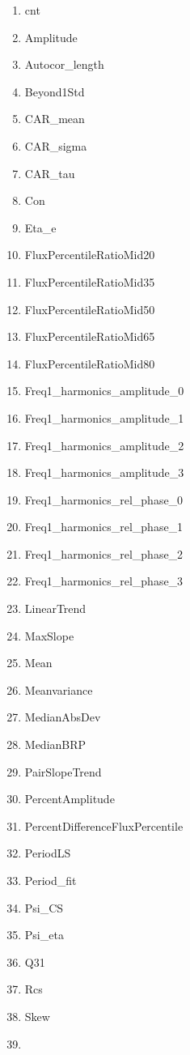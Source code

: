 \documentclass[11pt]{article}
\providecommand{\tightlist}{%
      \setlength{\itemsep}{0pt}\setlength{\parskip}{0pt}}
\begin{document}
    \begin{enumerate}
\def\labelenumi{\arabic{enumi}.}
\tightlist
\item
  cnt
\item
  Amplitude
\item
  Autocor\_length
\item
  Beyond1Std
\item
  CAR\_mean
\item
  CAR\_sigma
\item
  CAR\_tau
\item
  Con
\item
  Eta\_e
\item
  FluxPercentileRatioMid20
\item
  FluxPercentileRatioMid35
\item
  FluxPercentileRatioMid50
\item
  FluxPercentileRatioMid65
\item
  FluxPercentileRatioMid80
\item
  Freq1\_harmonics\_amplitude\_0
\item
  Freq1\_harmonics\_amplitude\_1
\item
  Freq1\_harmonics\_amplitude\_2
\item
  Freq1\_harmonics\_amplitude\_3
\item
  Freq1\_harmonics\_rel\_phase\_0
\item
  Freq1\_harmonics\_rel\_phase\_1
\item
  Freq1\_harmonics\_rel\_phase\_2
\item
  Freq1\_harmonics\_rel\_phase\_3
\item
  LinearTrend
\item
  MaxSlope
\item
  Mean
\item
  Meanvariance
\item
  MedianAbsDev
\item
  MedianBRP
\item
  PairSlopeTrend
\item
  PercentAmplitude
\item
  PercentDifferenceFluxPercentile
\item
  PeriodLS
\item
  Period\_fit
\item
  Psi\_CS
\item
  Psi\_eta
\item
  Q31
\item
  Rcs
\item
  Skew
\item

\end{enumerate}
\end{document}
